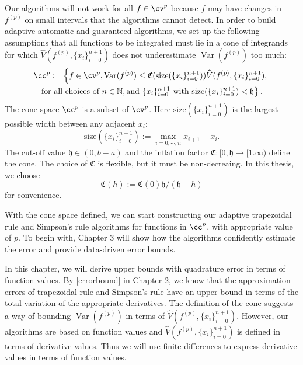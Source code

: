 \documentclass{iitthesis}
\DeclareMathOperator{\Var}{Var}
\theoremstyle{definition}
\theoremstyle{remark}
\begin{document}
Our algorithms will not work for all $f \in \cv^{p}$ because $f$ may have changes in $f^{(p)}$ on small intervals that the algorithms cannot detect. In order to build adaptive automatic and guaranteed algorithms, we set up the following assumptions that all functions to be integrated must lie in a cone of integrands for which $\widehat{V}(f^{(p)},\{x_i\}_{i=0}^{n+1})$ does not underestimate $\Var(f^{(p)})$ too much:
\begin{multline}\label{defcone}
\cc^{p}:=\left\{f\in \cv^{p}, \Var(f^{(p)})\leq \mathfrak{C}(\text{size}(\{x_i\}_{i=0}^{n+1}))\widehat{V}(f^{(p)},\{x_i\}_{i=0}^{n+1}),\right.\\ \left.\text{for all choices of } n\in \mathbb{N}, \text{and }\{x_i\}_{i=0}^{n+1} \text{ with }\text{size}(\{x_i\}_{i=0}^{n+1})<\mathfrak{h}\right\}.
\end{multline}
The cone space $\cc^{p}$ is a subset of $\cv^{p}$. Here $\text{size}(\{x_i\}_{i=0}^{n+1})$ is the largest possible width between any adjacent $x_i$:
\begin{equation}\label{defsize}
  \text{size}(\{x_i\}_{i=0}^{n+1}):=\max_{i=0,\cdots, n} x_{i+1}-x_{i}.
\end{equation}
The cut-off value $\mathfrak{h} \in (0, b-a)$ and the inflation factor $\mathfrak{C}: [0,\mathfrak{h} \rightarrow [1.\infty)$ define the cone. The choice of $\mathfrak{C}$ is flexible, but it must be non-decreaing. In this thesis, we choose
\begin{equation}\label{definflationfactor}
  \mathfrak{C}(h):=\mathfrak{C}(0)\mathfrak{h}/(\mathfrak{h}-h)
\end{equation}
for convenience.

With the cone space defined, we can start constructing our adaptive trapezoidal rule and Simpson's rule algorithms for functions in $\cc^{p}$, with appropriate value of $p$. To begin with, Chapter 3 will show how the algorithms confidently estimate the error and provide data-driven error bounds.





In this chapter, we will derive upper bounds with quadrature error in terms of function values. By \eqref{errorbound} in Chapter 2, we know that the approximation errors of trapezoidal rule and Simpson's rule have an upper bound in terms of the total variation of the appropriate derivatives. The definition of the cone suggests a way of bounding $\Var(f^{(p)})$ in terms of $\widehat{V}(f^{(p)},\{x_i\}_{i=0}^{n+1})$. However, our algorithms are based on function values and $\widehat{V}(f^{(p)},\{x_i\}_{i=0}^{n+1})$ is defined in terms of derivative values. Thus we will use finite differences to express derivative values in terms of function values.
\end{document}
